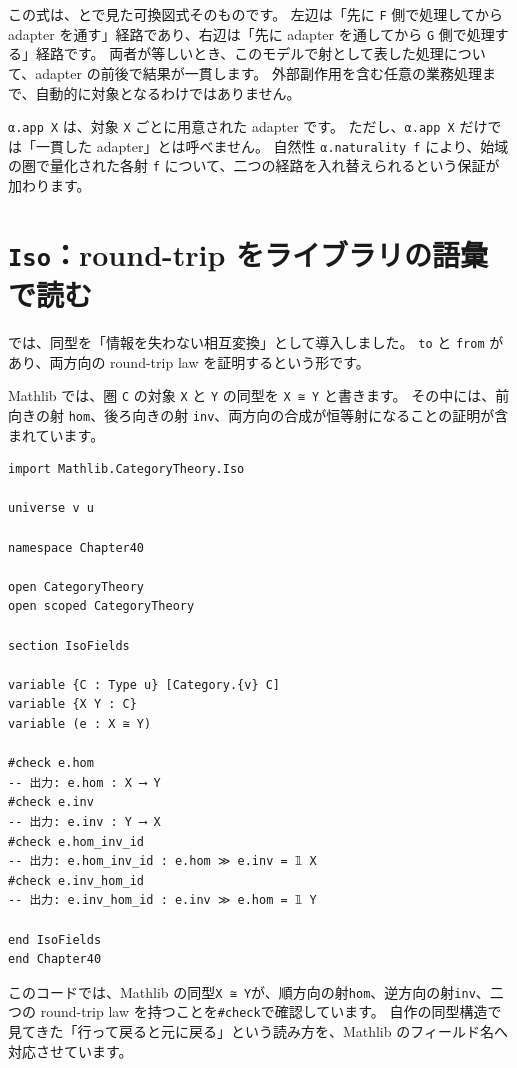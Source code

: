 この式は、とで見た可換図式そのものです。
左辺は「先に \texttt{F} 側で処理してから adapter を通す」経路であり、右辺は「先に adapter を通してから \texttt{G} 側で処理する」経路です。
両者が等しいとき、このモデルで射として表した処理について、adapter の前後で結果が一貫します。
外部副作用を含む任意の業務処理まで、自動的に対象となるわけではありません。

\texttt{α.app X} は、対象 \texttt{X} ごとに用意された adapter です。
ただし、\texttt{α.app X} だけでは「一貫した adapter」とは呼べません。
自然性 \texttt{α.naturality f} により、始域の圏で量化された各射 \texttt{f} について、二つの経路を入れ替えられるという保証が加わります。

\section{\texttt{Iso}：round-trip をライブラリの語彙で読む}

では、同型を「情報を失わない相互変換」として導入しました。
\texttt{to} と \texttt{from} があり、両方向の round-trip law を証明するという形です。

Mathlib では、圏 \texttt{C} の対象 \texttt{X} と \texttt{Y} の同型を \texttt{X ≅ Y} と書きます。
その中には、前向きの射 \texttt{hom}、後ろ向きの射 \texttt{inv}、両方向の合成が恒等射になることの証明が含まれています。

\begin{listing}[htbp]
\begin{verbatim}
import Mathlib.CategoryTheory.Iso

universe v u

namespace Chapter40

open CategoryTheory
open scoped CategoryTheory

section IsoFields

variable {C : Type u} [Category.{v} C]
variable {X Y : C}
variable (e : X ≅ Y)

#check e.hom
-- 出力: e.hom : X ⟶ Y
#check e.inv
-- 出力: e.inv : Y ⟶ X
#check e.hom_inv_id
-- 出力: e.hom_inv_id : e.hom ≫ e.inv = 𝟙 X
#check e.inv_hom_id
-- 出力: e.inv_hom_id : e.inv ≫ e.hom = 𝟙 Y

end IsoFields
end Chapter40
\end{verbatim}
\caption{\texttt{Iso.hom}・\texttt{Iso.inv}}
\label{lst:ch40_iso_basic}
\end{listing}

このコードでは、Mathlib の同型\texttt{X ≅ Y}が、順方向の射\texttt{hom}、逆方向の射\texttt{inv}、二つの round-trip law を持つことを\texttt{\#check}で確認しています。
自作の同型構造で見てきた「行って戻ると元に戻る」という読み方を、Mathlib のフィールド名へ対応させています。

